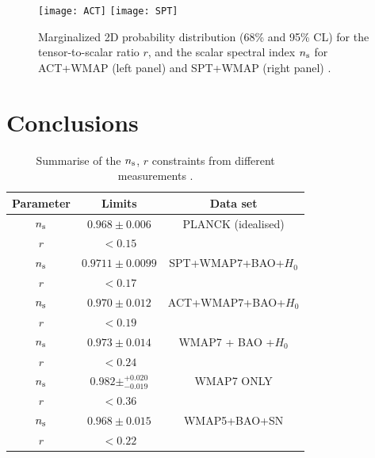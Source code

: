 \documentclass{rmaa}
\begin{document}
\begin{figure}[h!]
 \texttt{[image: ACT]}
  \texttt{[image: SPT]}
\caption{Marginalized 2D probability distribution (68\% and 95\% CL) for the 
tensor-to-scalar ratio $r$, and the scalar spectral index $n_{\rm s}$ for ACT+WMAP (left panel)
and SPT+WMAP (right panel)
 \citep{ACT,SPT}.}
 \label{fig:SPT}
\end{figure}

\section{Conclusions}


\begin{table}[h!]\centering
  \setlength{\tabnotewidth}{1.0\columnwidth}
   \setlength{\tabcolsep}{2.8\tabcolsep}
\caption{Summarise of the \lowercase{$n_{\rm s}$, $r$} constraints from different measurements .}
\label{tab:resul}
\begin{tabular}{|c|c|c|}
\toprule
Parameter & Limits & Data set\\
\hline
$n_{\rm s}$& $ 0.968 \pm {0.006}$ & PLANCK (idealised)\\ 
$r$ & $< 0.15$ & \\
\hline
$n_{\rm s}$& $ 0.9711 \pm {0.0099}$ & SPT+WMAP7+BAO+$H_0$\\ 
$r$ & $< 0.17$ & \\
\hline
$n_{\rm s}$& $ 0.970 \pm {0.012}$ & ACT+WMAP7+BAO+$H_0$\\ 
$r$ & $< 0.19$ & \\
\hline
$n_{\rm s}$& $ 0.973 \pm 0.014$ & WMAP7 + BAO +$H_0$\\ 
$r$ & $< 0.24$ & \\
\hline
$n_{\rm s}$& $ 0.982 \pm ^{+0.020}_{-0.019}$ & WMAP7 ONLY\\ 
$r$ & $< 0.36$ & \\
\hline
$n_{\rm s}$& $ 0.968 \pm 0.015$ & WMAP5+BAO+SN\\ 
$r$ & $< 0.22$ & \\
\hline

\end{tabular}
\end{table}
\end{document}
